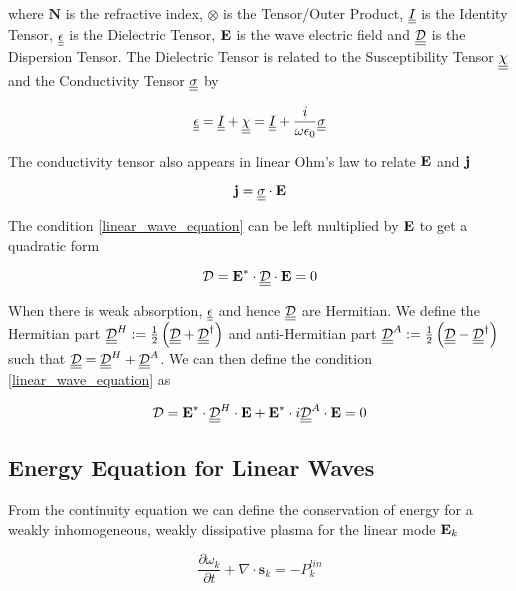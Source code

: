 where $\textbf{N}$ is the refractive index, $\otimes$ is the Tensor/Outer Product, $\underline{\underline{I}}$ is the Identity Tensor, $\underline{\underline{\epsilon}}$ is the Dielectric Tensor, $\textbf{E}$ is the wave electric field and $\underline{\underline{\mathcal{D}}}$ is the Dispersion Tensor. The Dielectric Tensor is related to the Susceptibility Tensor $\underline{\underline{\chi}}$ and the Conductivity Tensor $\underline{\underline{\sigma}}$ by

\begin{equation}\label{dielectric tensor def}
	\underline{\underline{\epsilon}} = \underline{\underline{I}} + \underline{\underline{\chi}} = \underline{\underline{I}} + \frac{i}{\omega \epsilon_0} \underline{\underline{\sigma}}
\end{equation}

The conductivity tensor also appears in linear Ohm's law to relate $\textbf{E}$ and $\textbf{j}$

\begin{equation}\label{Ohm's Law}
	\textbf{j} = \underline{\underline{\sigma}} \cdot \textbf{E}
\end{equation}

The condition \eqref{linear_wave_equation} can be left multiplied by $\textbf{E}$ to get a quadratic form

\begin{equation}\label{linear wave equation quad form}
	\mathcal{D} = \textbf{E}^{*} \cdot \underline{\underline{\mathcal{D}}} \cdot \textbf{E} = 0
\end{equation}

When there is weak absorption, $\underline{\underline{\epsilon}}$ and hence $\underline{\underline{\mathcal{D}}}$ are Hermitian. We define the Hermitian part $\underline{\underline{\mathcal{D}}}^H := \frac{1}{2} \left( \underline{\underline{\mathcal{D}}} + \underline{\underline{\mathcal{D}}}^{\dagger} \right)$ and anti-Hermitian part $\underline{\underline{\mathcal{D}}}^A := \frac{1}{2} \left( \underline{\underline{\mathcal{D}}} - \underline{\underline{\mathcal{D}}}^{\dagger} \right)$ such that $\underline{\underline{\mathcal{D}}} = \underline{\underline{\mathcal{D}}}^H + \underline{\underline{\mathcal{D}}}^A$. We can then define the condition \eqref{linear_wave_equation} as

\begin{equation}
	\mathcal{D} = \textbf{E}^{*} \cdot \underline{\underline{\mathcal{D}}}^H \cdot \textbf{E} + \textbf{E}^{*} \cdot i\underline{\underline{\mathcal{D}}}^A \cdot \textbf{E} = 0
\end{equation}

\subsection{Energy Equation for Linear Waves}
From the continuity equation we can define the conservation of energy for a weakly inhomogeneous, weakly dissipative plasma for the linear mode $\textbf{E}_k$

\begin{equation} \label{Energy Equation Linear Waves}
	\frac{\partial \omega_k}{\partial t} + \nabla \cdot \textbf{s}_k = - P_k^{lin}
\end{equation}

